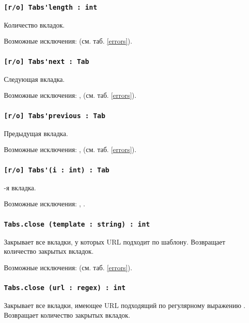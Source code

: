 \subsubsection{\lstinline|[r/o] Tabs'length : int|}

Количество вкладок.

Возможные исключения:  (см. таб. \ref{errors}).

\subsubsection{\lstinline|[r/o] Tabs'next : Tab|}

Следующая вкладка.

Возможные исключения: ,  (см. таб. \ref{errors}).

\subsubsection{\lstinline|[r/o] Tabs'previous : Tab|}

Предыдущая вкладка.

Возможные исключения: ,  (см. таб. \ref{errors}).

\subsubsection{\lstinline|[r/o] Tabs'(i : int) : Tab|}

-я вкладка.

Возможные исключения: , .

\subsubsection{\lstinline|Tabs.close (template : string) : int|}

Закрывает все вкладки, у которых URL подходит по шаблону. Возвращает количество закрытых вкладок.

Возможные исключения:  (см. таб. \ref{errors}).

\subsubsection{\lstinline|Tabs.close (url : regex) : int|}

Закрывает все вкладки, имеющее URL подходящий по регулярному выражению . Возвращает количество закрытых вкладок.

